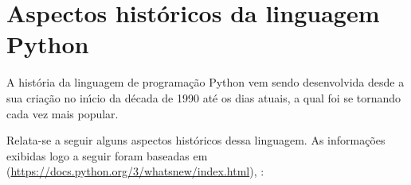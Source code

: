    \section{Aspectos hist\'{o}ricos da linguagem Python}

A hist\'{o}ria da linguagem de programa\c{c}\~{a}o Python vem sendo desenvolvida desde a sua cria\c{c}\~{a}o no in\'{\i}cio da d\'{e}cada de 1990 at\'{e} os dias atuais, a qual foi se tornando cada vez mais popular.

Relata-se a seguir alguns aspectos hist\'{o}ricos dessa linguagem. As informações exibidas logo a seguir foram baseadas em  (\url{https://docs.python.org/3/whatsnew/index.html}), \cite{Rossum2010, Silva2019, Montoro2012} :

